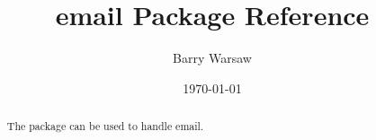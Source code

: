 \documentclass{howto}
\title{email Package Reference}
\author{Barry Warsaw}
\date{\today}
\begin{document}
\maketitle

\begin{abstract}
  The  package can be used to handle email.
\end{abstract}

%
\tableofcontents


\end{document}
